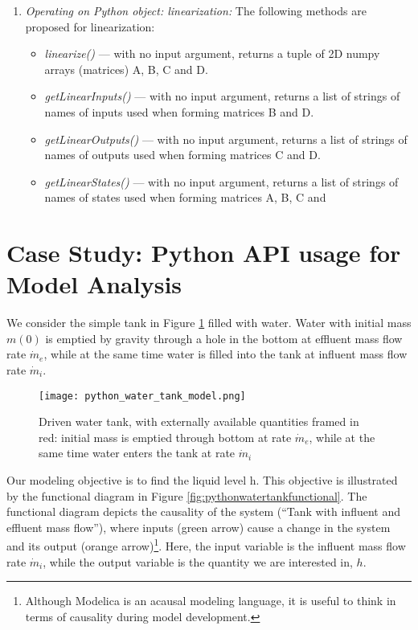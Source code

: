 \begin{enumerate}
	\item \textit{Operating on Python object: linearization:} The following methods are proposed for linearization:
	\begin{itemize}
		\item \textit{linearize()} — with no input argument, returns a tuple of 2D numpy arrays (matrices) A, B, C and D.
		\item \textit{getLinearInputs()} — with no input argument, returns a list of strings of names of inputs used when forming matrices B and D.
		\item \textit{getLinearOutputs()} — with no input argument, returns a list of strings of names of outputs used when forming matrices C and D.
		\item \textit{getLinearStates()} — with no input argument, returns a list of strings of names of states used when forming matrices A, B, C and
	\end{itemize}
\end{enumerate}

\section{Case Study: Python API usage for Model Analysis}
\label{subsec:pythoncasestudy}

We consider the simple tank in Figure \ref{fig:pythonwatertankmodel} filled with water. Water with initial mass $m(0)$ is emptied by gravity
through a hole in the bottom at effluent mass flow rate $\dot{m}_e$, while at the same time water is filled into the tank at influent mass flow rate $\dot{m}_i$.

\begin{figure}
	\texttt{[image: python\_water\_tank\_model.png]}
	\caption{Driven water tank, with externally available quantities framed	in red: initial mass is emptied through bottom at rate $\dot{m}_e $, while at the same time water enters the tank at rate $\dot{m}_i$ }
	\label{fig:pythonwatertankmodel}
\end{figure}

Our modeling objective is to find the liquid level h. This objective is illustrated by the functional diagram in
Figure \ref{fig:pythonwatertankfunctional}. The functional diagram depicts the causality of the system (“Tank with influent and effluent mass flow”), where inputs (green arrow) cause a change in the system and its output (orange arrow)\footnote{Although Modelica is an acausal modeling language, it is useful to think in terms of causality during model development.}. Here, the input variable is the influent mass flow rate $\dot{m}_i$, while the output variable is the quantity we are interested in, $h$.


